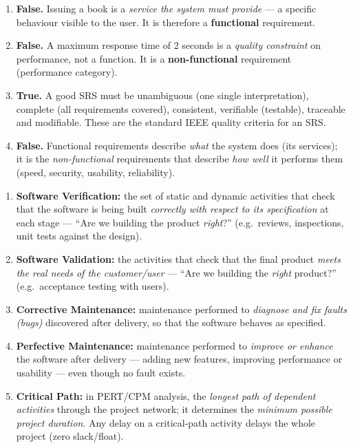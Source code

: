 \documentclass[11pt]{article}
\newcommand{\cle}[1]{{\popxbold\color{popdark}#1}}
\begin{document}
\begin{corrige}
\begin{enumerate}
    \item \textbf{False.} Issuing a book is a \emph{service the system must provide} — a specific behaviour visible to the user. It is therefore a \textbf{functional} requirement.
    \item \textbf{False.} A maximum response time of 2 seconds is a \emph{quality constraint} on performance, not a function. It is a \textbf{non-functional} requirement (performance category).
    \item \textbf{True.} A good \cle{SRS} must be unambiguous (one single interpretation), complete (all requirements covered), consistent, verifiable (testable), traceable and modifiable. These are the standard IEEE quality criteria for an SRS.
    \item \textbf{False.} Functional requirements describe \emph{what} the system does (its services); it is the \emph{non-functional} requirements that describe \emph{how well} it performs them (speed, security, usability, reliability).
\end{enumerate}
\end{corrige}

\begin{corrige}
\begin{enumerate}
    \item \textbf{Software Verification:} the set of static and dynamic activities that check that the software is being built \emph{correctly with respect to its specification} at each stage — ``Are we building the product \emph{right}?'' (e.g.\ reviews, inspections, unit tests against the design).
    \item \textbf{Software Validation:} the activities that check that the final product \emph{meets the real needs of the customer/user} — ``Are we building the \emph{right} product?'' (e.g.\ acceptance testing with users).
    \item \textbf{Corrective Maintenance:} maintenance performed to \emph{diagnose and fix faults (bugs)} discovered after delivery, so that the software behaves as specified.
    \item \textbf{Perfective Maintenance:} maintenance performed to \emph{improve or enhance} the software after delivery — adding new features, improving performance or usability — even though no fault exists.
    \item \textbf{Critical Path:} in PERT/CPM analysis, the \emph{longest path of dependent activities} through the project network; it determines the \emph{minimum possible project duration}. Any delay on a critical-path activity delays the whole project (zero slack/float).
\end{enumerate}
\end{corrige}
\end{document}
